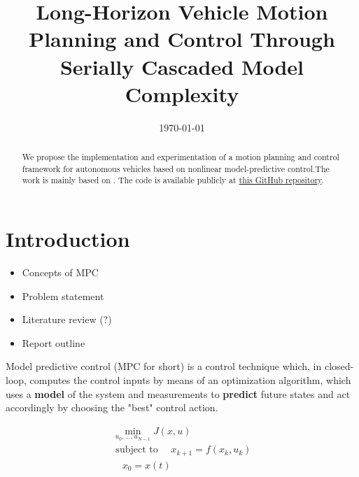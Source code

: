 \documentclass[a4paper, twocolumn, 11pt, twoside]{article}
\title{Long-Horizon Vehicle Motion Planning and Control Through Serially Cascaded Model Complexity}
\author{}
\date{\today}
\begin{document}
\maketitle

\begin{abstract}
    We propose the implementation and experimentation of a motion planning and
    control framework for autonomous vehicles based on nonlinear
    model-predictive control.The work is mainly based on \cite{paper}. The code is available publicly at
    \href{https://github.com/neverorfrog/vehicle-control}{this GitHub
    repository}. 
\end{abstract}


\section*{Introduction}

\begin{itemize}
    \item Concepts of MPC
    \item Problem statement
    \item Literature review (?)
    \item Report outline
\end{itemize}

Model predictive control (MPC for short) is a control technique which, in closed-loop,
computes the control inputs by means of an optimization algorithm, which uses a
\textbf{model} of the system and measurements to \textbf{predict} future states and act
accordingly by choosing the "best" control action. 

\begin{equation}
\begin{aligned}
    \min_{u_0,...,u_{N-1}}{J(x,u)} \\
    \text{ subject to }
        \quad x_{k+1} = f(x_k,u_k) \\
        \quad x_0 = x(t)
        \quad 
\end{aligned}
\end{equation}
\end{document}
